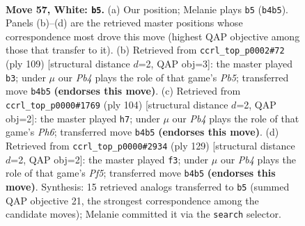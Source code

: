 \documentclass[11pt]{article}
\begin{document}
\clearpage

\begin{figure}[p]\centering
\begin{subfigure}{0.46\textwidth}\centering
\resizebox{\linewidth}{!}{%
\newchessgame
\chessboard[
  setfen={4k3/8/8/8/RP2p1r1/8/4K3/8 w - - 0 57},
  showmover=false,
  pgfstyle=straightmove, color=movearrow, markmove={b4-b5}
]}
\caption{}
\end{subfigure}\hfill
\begin{subfigure}{0.46\textwidth}\centering
\resizebox{\linewidth}{!}{%
\newchessgame
\chessboard[
  setfen={8/8/3k4/5R2/rp6/5P1K/8/8 b - - 0 55},
  showmover=false,
  pgfstyle=straightmove, color=movearrow, markmove={b4-b3}
]}
\caption{}
\end{subfigure}
\\[4pt]
\begin{subfigure}{0.46\textwidth}\centering
\resizebox{\linewidth}{!}{%
\newchessgame
\chessboard[
  setfen={1r6/8/6RP/3k4/1p3K2/8/8/8 w - - 0 53},
  showmover=false,
  pgfstyle=straightmove, color=movearrow, markmove={h6-h7}
]}
\caption{}
\end{subfigure}\hfill
\begin{subfigure}{0.46\textwidth}\centering
\resizebox{\linewidth}{!}{%
\newchessgame
\chessboard[
  setfen={8/8/8/P3R3/5pr1/1K1k4/8/8 b - - 0 65},
  showmover=false,
  pgfstyle=straightmove, color=movearrow, markmove={f4-f3}
]}
\caption{}
\end{subfigure}
\caption{\textbf{Move 57, White: \texttt{b5}.} (a) Our position; Melanie plays \texttt{b5} (\texttt{b4b5}). Panels (b)--(d) are the retrieved master positions whose correspondence most drove this move (highest QAP objective among those that transfer to it). (b) Retrieved from \texttt{ccrl\_top\_p0002\#72} (ply 109) [structural distance $d$=2, QAP obj=3]: the master played \texttt{b3}; under $\mu$ our \emph{Pb4} plays the role of that game's \emph{Pb5}; transferred move \texttt{b4b5} \textbf{(endorses this move)}. (c) Retrieved from \texttt{ccrl\_top\_p0000\#1769} (ply 104) [structural distance $d$=2, QAP obj=2]: the master played \texttt{h7}; under $\mu$ our \emph{Pb4} plays the role of that game's \emph{Ph6}; transferred move \texttt{b4b5} \textbf{(endorses this move)}. (d) Retrieved from \texttt{ccrl\_top\_p0000\#2934} (ply 129) [structural distance $d$=2, QAP obj=2]: the master played \texttt{f3}; under $\mu$ our \emph{Pb4} plays the role of that game's \emph{Pf5}; transferred move \texttt{b4b5} \textbf{(endorses this move)}. Synthesis: 15 retrieved analogs transferred to \texttt{b5} (summed QAP objective 21, the strongest correspondence among the candidate moves); Melanie committed it via the \texttt{search} selector.}
\label{fig:thought-m112}
\end{figure}
\end{document}
